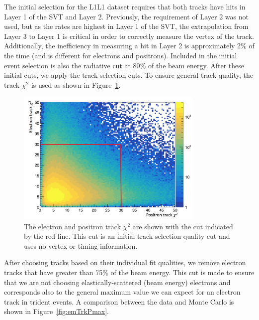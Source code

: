 The initial selection for the L1L1 dataset requires that both tracks have hits in Layer 1 of the SVT and Layer 2. Previously, the requirement of Layer 2 was not used, but as the rates are highest in Layer 1 of the SVT, the extrapolation from Layer 3 to Layer 1 is critical in order to correctly measure the vertex of the track. Additionally, the inefficiency in measuring a hit in Layer 2 is approximately 2$\%$ of the time (and is different for electrons and positrons). Included in the initial event selection is also the radiative cut at 80$\%$ of the beam energy. After these initial cuts, we apply the track selection cuts. To ensure general track quality, the track $\chi^2$ is used as shown in Figure~\ref{fig:trkChi2}.

\begin{figure}[H]
  \centering
      \includegraphics[width=0.8\textwidth]{pics/searching/trkChi2.png}
  \caption{The electron and positron track $\chi^2$ are shown with the cut indicated by the red line. This cut is an initial track selection quality cut and uses no vertex or timing information.}
  \label{fig:trkChi2}
\end{figure} 

After choosing tracks based on their individual fit qualities, we remove electron tracks that have greater than 75$\%$ of the beam energy. This cut is made to ensure that we are not choosing elastically-scattered (beam energy) electrons and corresponds also to the general maximum value we can expect for an electron track in trident events. A comparison between the data and Monte Carlo is shown in Figure~\ref{fig:emTrkPmax}.

